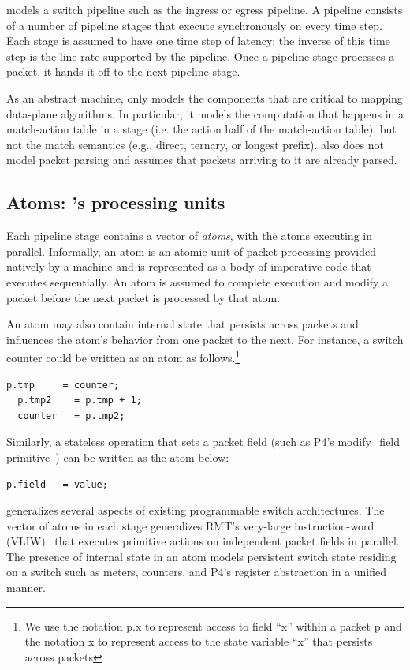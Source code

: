 \absmachine models a switch pipeline such as the ingress or egress pipeline. A
pipeline consists of a number of pipeline stages that execute synchronously on
every time step. Each stage is assumed to have one time step of latency;
the inverse of this time step is the line rate supported by the pipeline. Once
a pipeline stage processes a packet, it hands it off to the next pipeline
stage.

As an abstract machine, \absmachine only models the components that are
critical to mapping data-plane algorithms. In particular, it models the
computation that happens in a match-action table in a stage (i.e. the action
half of the match-action table), but not the match semantics (e.g., direct,
ternary, or longest prefix). \absmachine also does not model packet parsing and
assumes that packets arriving to it are already parsed.

\subsection{Atoms: \absmachine's processing units}

Each pipeline stage contains a vector of \textit{atoms}, with the atoms
executing in parallel. Informally, an atom is an atomic unit of packet
processing provided natively by a \absmachine machine and is represented
as a body of imperative code that executes sequentially. An atom is assumed to
complete execution and modify a packet before the next packet is processed by
that atom.

An atom may also contain internal state that persists across packets and
influences the atom's behavior from one packet to the next. For instance, a
switch counter could be written as an atom as follows.\footnote{We use the
  notation p.x to represent access to field ``x'' within a packet p and the
  notation x to represent access to the state variable ``x'' that persists across packets}
  \begin{lstlisting}[style=customc]
  p.tmp     = counter;
  p.tmp2    = p.tmp + 1;
  counter   = p.tmp2;
  \end{lstlisting}
Similarly, a stateless operation that sets a packet field (such as P4's
modify\_field primitive~\cite{p4spec}) can be written as the atom
below:
\begin{lstlisting}[style=customc]
p.field   = value;
\end{lstlisting}

\absmachine generalizes several aspects of existing programmable switch
architectures. The vector of atoms in each stage generalizes RMT's very-large
instruction-word (VLIW)~\cite{rmt} that executes primitive actions on
independent packet fields in parallel. The presence of internal state in an
atom models persistent switch state residing on a switch such as meters,
counters, and P4's register abstraction in a unified manner.

